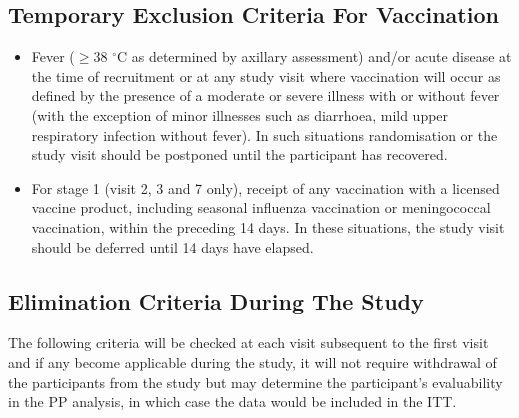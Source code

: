 \documentclass{bmcart}
\begin{document}
\subsection*{Temporary Exclusion Criteria For Vaccination}


\begin{itemize}
	\item Fever ($\geq$38 $^{\circ}$C as determined by axillary assessment) and/or acute disease at the time of recruitment or at any study visit where vaccination will occur as defined by the presence of a moderate or severe illness with or without fever (with the exception of minor illnesses such as diarrhoea, mild upper respiratory infection without fever). In such situations randomisation or the study visit should be postponed until the participant has recovered.
	\item For stage 1 (visit 2, 3 and 7 only), receipt of any vaccination with a licensed vaccine product, including seasonal influenza vaccination or meningococcal vaccination, within the preceding 14 days. In these situations, the study visit should be deferred until 14 days have elapsed.
\end{itemize}

\subsection*{Elimination Criteria During The Study}

The following criteria will be checked at each visit subsequent to the first visit and if any become applicable during the study, it will not require withdrawal of the participants from the study but may determine the participant's evaluability in the PP analysis, in which case the data would be included in the ITT.
\end{document}
